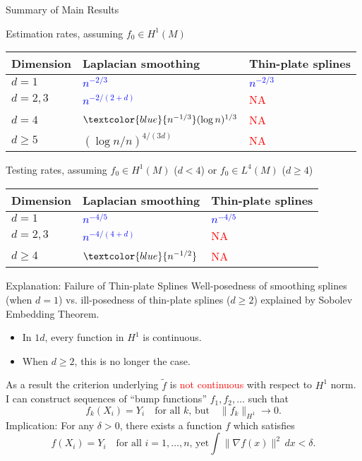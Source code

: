 \documentclass{beamer}
\newcommand{\wt}[1]{\widetilde{#1}}
\newcommand{\red}[1]{\textcolor{red}{#1}}
\newcommand{\blue}[1]{\textcolor{blue}{#1}}
\begin{document}
\begin{frame}{Summary of Main Results}

{\large Estimation rates, assuming $f_0 \in H^1(M)$}
\begin{table}
	\begin{center}
		\begin{tabular}{p{} | p{} p{} }
			Dimension & Laplacian smoothing & Thin-plate splines \\
			\hline
			$d = 1$ & \blue{${n^{-2/3}}$} & \blue{${n^{-2/3}}$} \\
			$d = 2,3$ & \blue{${n^{-2/(2 + d)}}$} & \red{NA} \\
			$d = 4$ & $\blue{{n^{-1/3}}} (\log n)^{1/3}$ & \red{NA} \\
			$d \geq 5$  & $(\log n/n)^{4/(3d)}$ & \red{NA} \\
		\end{tabular}
	\end{center}
\end{table}

{\large Testing rates, assuming $f_0 \in H^1(M)$ ($d < 4$) or $f_0 \in L^4(M)$ ($d \geq 4$)}
\begin{table}
	\begin{center}
		\begin{tabular}{p{} | p{} p{} }
			Dimension & Laplacian smoothing & Thin-plate splines \\
			\hline
			$d = 1$ & \blue{${n^{-4/5}}$} & \blue{${n^{-4/5}}$} \\
			$d = 2,3$ & \blue{${n^{-4/(4 + d)}}$} & \red{NA} \\
			$d \geq 4$ & $\blue{{n^{-1/2}}}$ & \red{NA} \\
		\end{tabular}
	\end{center}
\end{table}
\end{frame}

\begin{frame}{Explanation: Failure of Thin-plate Splines}
Well-posedness of smoothing splines (when $d = 1$) vs. ill-posedness of thin-plate splines ($d \geq 2$) explained by \alert{Sobolev Embedding Theorem}.
\begin{itemize}
	\item In $1d$, every function in $H^1$ is continuous. 
	\item When $d \geq 2$, this is no longer the case.
\end{itemize}
As a result the criterion underlying $\wt{f}$ is \red{not continuous} with respect to $H^1$ norm. I can construct sequences of ``bump functions'' $f_1,f_2,\ldots$ such that
\begin{equation*}
f_k(X_i) = Y_i \quad \text{for all $k$, but} \quad \|f_k\|_{H^1} \to 0.
\end{equation*}
Implication: For any $\delta > 0$, there exists a function $f$ which satisfies
\begin{equation*}
f(X_i) = Y_i \quad \text{for all $i = 1,\ldots,n$, yet} \int\|\nabla f(x)\|^2 \,dx < \delta. 
\end{equation*} 
\end{frame}
\end{document}
